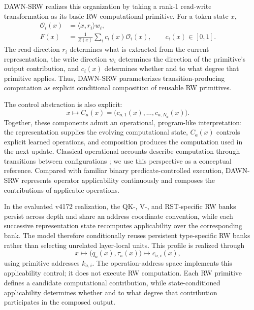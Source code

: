 \documentclass{article}
\newcommand{\DAWN}{DAWN-SRW}
\newcommand{\op}{\mathcal{O}}
\begin{document}
\DAWN{} realizes this organization by taking a rank-1 read-write transformation
as its basic RW computational primitive. For a token state \(x\),
\begin{align}
\op_i(x)&=\langle x,r_i\rangle w_i,
\label{eq:intro_operator}\\
F(x)&=\frac{1}{Z(x)}\sum_i c_i(x)\op_i(x),
\qquad c_i(x)\in[0,1].
\label{eq:intro_field}
\end{align}
The read direction \(r_i\) determines what is extracted from the current
representation, the write direction \(w_i\) determines the direction of the
primitive's output contribution, and \(c_i(x)\) determines whether and to what
degree that primitive applies. Thus, \DAWN{} parameterizes transition-producing
computation as explicit conditional composition of reusable RW primitives.

The control abstraction is also explicit:
\begin{equation}
x\longmapsto C_a(x)
=\big(c_{a,1}(x),\ldots,c_{a,N_a}(x)\big).
\label{eq:intro_control}
\end{equation}
Together, these components admit an operational, program-like interpretation:
the representation supplies the evolving computational state, \(C_a(x)\)
controls explicit learned operations, and composition produces the computation
used in the next update. Classical operational accounts describe computation
through transitions between configurations \cite{plotkin1981structural}; we use
this perspective as a conceptual reference. Compared with familiar binary
predicate-controlled execution, \DAWN{} represents operator applicability
continuously and composes the contributions of applicable operations.

In the evaluated v4172 realization, the QK-, V-, and RST-specific RW banks
persist across depth and share an address coordinate convention, while each
successive representation state recomputes applicability over the corresponding
bank. The model therefore conditionally reuses persistent type-specific
RW banks rather than selecting unrelated layer-local units. This
profile is realized through
\[
x\longmapsto\big(q_a(x),\tau_a(x)\big)
\longmapsto c_{a,i}(x),
\]
using primitive addresses \(k_{a,i}\). The operation-address space implements
this applicability control; it does not execute RW computation. Each RW
primitive defines a candidate computational contribution, while
state-conditioned applicability determines whether and to what degree that
contribution participates in the composed output.
\end{document}
